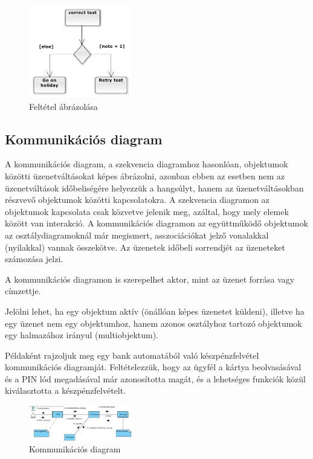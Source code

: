 \documentclass[margin=0px]{article}
\begin{document}
\begin{figure}[H]
    \centering
    \includegraphics[width=0.4\textwidth]{img/tevekenyseg2.png}
    \caption{Feltétel ábrázolása}
\end{figure}

\subsection{Kommunikációs diagram}

A kommunikációs diagram, a szekvencia diagramhoz hasonlóan, objektumok közötti üzenetváltásokat képes ábrázolni, azonban ebben az esetben nem az üzenetváltások időbeliségére helyezzük a hangsúlyt, hanem az üzenetváltásokban részvevő objektumok közötti kapcsolatokra. A szekvencia diagramon az objektumok kapcsolata csak közvetve jelenik meg, azáltal, hogy mely elemek között van interakció. A kommunikációs diagramon az együttműködő objektumok az osztálydiagramoknál már megismert, asszociációkat jelző vonalakkal (nyilakkal) vannak összekötve. Az üzenetek időbeli sorrendjét az üzeneteket számozása jelzi.

A kommunikációs diagramon is szerepelhet aktor, mint az üzenet forrása vagy címzettje.

Jelölni lehet, ha egy objektum aktív (önállóan képes üzenetet küldeni), illetve ha egy üzenet nem egy objektumhoz, hanem azonos osztályhoz tartozó objektumok egy halmazához irányul (multiobjektum).

Példaként rajzoljuk meg egy bank automatából való készpénzfelvétel kommunikációs diagramját. Feltételezzük, hogy az ügyfél a kártya beolvasásával és a PIN lód megadásával már azonosította magát, és a lehetséges funkciók közül kiválasztotta a készpénzfelvételt.

\begin{figure}[H]
    \centering
    \includegraphics[width=0.4\textwidth]{img/kommunikacios_diagram.jpg}
    \caption{Kommunikációs diagram}
\end{figure}
\end{document}
